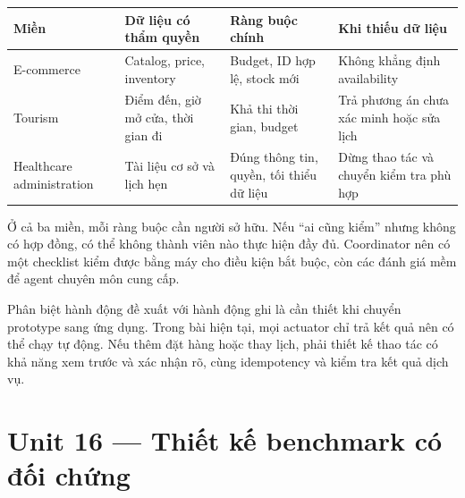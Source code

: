 {\def\LTcaptype{none} %
\begin{longtable}[]{@{}
  >{\raggedright\arraybackslash}p{}
  >{\raggedright\arraybackslash}p{}
  >{\raggedright\arraybackslash}p{}
  >{\raggedright\arraybackslash}p{}@{}}
\toprule\noalign{}
\begin{minipage}[b]{\linewidth}\raggedright
Miền
\end{minipage} & \begin{minipage}[b]{\linewidth}\raggedright
Dữ liệu có thẩm quyền
\end{minipage} & \begin{minipage}[b]{\linewidth}\raggedright
Ràng buộc chính
\end{minipage} & \begin{minipage}[b]{\linewidth}\raggedright
Khi thiếu dữ liệu
\end{minipage} \\
\midrule\noalign{}
\endhead
\bottomrule\noalign{}
\endlastfoot
E-commerce & Catalog, price, inventory & Budget, ID hợp lệ, stock mới &
Không khẳng định availability \\
Tourism & Điểm đến, giờ mở cửa, thời gian đi & Khả thi thời gian, budget
& Trả phương án chưa xác minh hoặc sửa lịch \\
Healthcare administration & Tài liệu cơ sở và lịch hẹn & Đúng thông tin,
quyền, tối thiểu dữ liệu & Dừng thao tác và chuyển kiểm tra phù hợp \\
\end{longtable}
}

Ở cả ba miền, mỗi ràng buộc cần người sở hữu. Nếu ``ai cũng kiểm'' nhưng
không có hợp đồng, có thể không thành viên nào thực hiện đầy đủ.
Coordinator nên có một checklist kiểm được bằng máy cho điều kiện bắt
buộc, còn các đánh giá mềm để agent chuyên môn cung cấp.

Phân biệt hành động đề xuất với hành động ghi là cần thiết khi chuyển
prototype sang ứng dụng. Trong bài hiện tại, mọi actuator chỉ trả kết
quả nên có thể chạy tự động. Nếu thêm đặt hàng hoặc thay lịch, phải
thiết kế thao tác có khả năng xem trước và xác nhận rõ, cùng idempotency
và kiểm tra kết quả dịch vụ.

\section{Unit 16 --- Thiết kế benchmark có đối
chứng}\label{unit-16-thiux1ebft-kux1ebf-benchmark-cuxf3-ux111ux1ed1i-chux1ee9ng}

